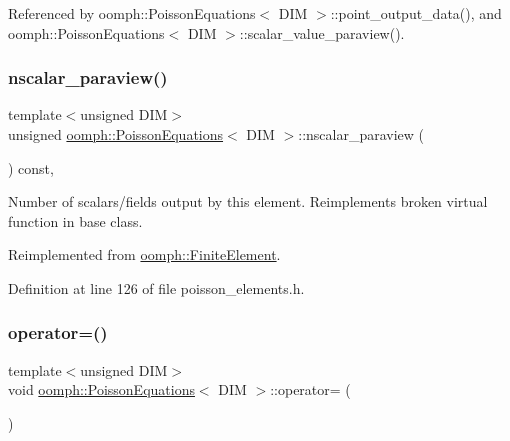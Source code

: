 Referenced by oomph\+::\+Poisson\+Equations$<$ D\+I\+M $>$\+::point\+\_\+output\+\_\+data(), and oomph\+::\+Poisson\+Equations$<$ D\+I\+M $>$\+::scalar\+\_\+value\+\_\+paraview().

\mbox{\label{classoomph_1_1PoissonEquations_a8a34f70a57c1aad552a9624ea0fb0906}} 
\subsubsection{\texorpdfstring{nscalar\+\_\+paraview()}{nscalar\_paraview()}}
{\footnotesize\ttfamily template$<$unsigned D\+IM$>$ \\
unsigned \hyperlink{classoomph_1_1PoissonEquations}{oomph\+::\+Poisson\+Equations}$<$ D\+IM $>$\+::nscalar\+\_\+paraview (\begin{DoxyParamCaption}{ }\end{DoxyParamCaption}) const\hspace{0.3cm}{\ttfamily [inline]}, {\ttfamily [virtual]}}



Number of scalars/fields output by this element. Reimplements broken virtual function in base class. 



Reimplemented from \hyperlink{classoomph_1_1FiniteElement_a865e2e5586552ba80babdbe26a77fe8c}{oomph\+::\+Finite\+Element}.



Definition at line 126 of file poisson\+\_\+elements.\+h.

\mbox{\label{classoomph_1_1PoissonEquations_a80817f45bd1db3758570964f11dd5c74}} 
\subsubsection{\texorpdfstring{operator=()}{operator=()}}
{\footnotesize\ttfamily template$<$unsigned D\+IM$>$ \\
void \hyperlink{classoomph_1_1PoissonEquations}{oomph\+::\+Poisson\+Equations}$<$ D\+IM $>$\+::operator= (\begin{DoxyParamCaption}\item[{const \hyperlink{classoomph_1_1PoissonEquations}{Poisson\+Equations}$<$ D\+IM $>$ \&}]{ }\end{DoxyParamCaption})\hspace{0.3cm}{\ttfamily [inline]}}



